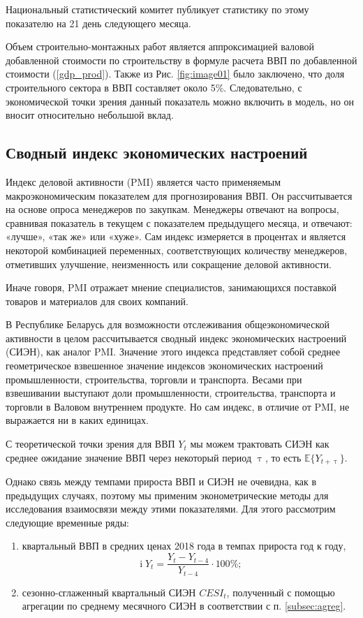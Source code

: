 \documentclass[a4paper, 14pt]{extreport}
\numberwithin{equation}{section}
\renewcommand{\tau}{\uptau}
\renewcommand{\i}{\operatorname{i}}
\numberwithin{equation}{section}
\begin{document}
	Национальный статистический комитет публикует статистику по этому показателю на 21 день следующего месяца.
	
	Объем строительно-монтажных работ является аппроксимацией валовой добавленной стоимости по строительству в формуле расчета ВВП по добавленной стоимости (\ref{gdp_prod}). Также из Рис. \ref{fig:image01} было заключено, что доля строительного сектора в ВВП составляет около 5\%. Следовательно, с экономической точки зрения данный показатель можно включить в модель, но он вносит относительно небольшой вклад.
	
	\subsection{Сводный индекс экономических настроений}
	\label{subsec:cesi}
	
	Индекс деловой активности (PMI) является часто применяемым макроэкономическим показателем для прогнозирования ВВП. Он рассчитывается на основе опроса менеджеров по закупкам. Менеджеры отвечают на вопросы, сравнивая показатель в текущем с показателем предыдущего месяца, и отвечают: «лучше», «так же» или «хуже». Сам индекс измеряется в процентах и является некоторой комбинацией переменных, соответствующих количеству менеджеров, отметивших улучшение, неизменность или сокращение деловой активности.
	
	 Иначе говоря, PMI отражает мнение специалистов, занимающихся поставкой товаров и материалов для своих компаний.
	 
	 В Республике Беларусь для возможности отслеживания общеэкономической активности в целом рассчитывается сводный индекс
	 экономических настроений (СИЭН), как аналог PMI.
	 Значение этого индекса представляет собой среднее геометрическое взвешенное
	 значение индексов экономических настроений промышленности, строительства,
	 торговли и транспорта. Весами при взвешивании выступают доли промышленности,
	 строительства, транспорта и торговли в Валовом внутреннем продукте. Но сам индекс, в отличие от PMI, не выражается ни в каких единицах.
	 
	 С теоретической точки зрения для ВВП $Y_t$ мы можем трактовать СИЭН как среднее ожидание значение ВВП через некоторый период $\tau$, то есть $\mathbb E \{Y_{t+\tau}\}$.
	 
	 Однако связь между темпами прироста ВВП и СИЭН не очевидна, как в предыдущих случаях, поэтому мы применим эконометрические методы для исследования взаимосвязи между этими показателями.
	 Для этого рассмотрим следующие временные ряды:
	 \begin{enumerate}
	 	\item квартальный ВВП в средних ценах 2018 года в темпах прироста год к году, 
	 	\begin{equation}
	 		\i Y_{t} = \dfrac{Y_t - Y_{t-4}}{Y_{t-4}}\cdot 100\%;
	 	\end{equation}
	 	\item сезонно-сглаженный квартальный СИЭН  ${CESI}_t$, полученный с помощью агрегации по среднему месячного СИЭН в соответствии с п. \ref{subsec:agreg}.
	 \end{enumerate}
	 
\end{document}
